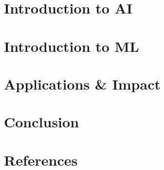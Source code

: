 \section[IntroAI]{Introduction to AI}


\section[IntroML]{Introduction to ML}


\section[Impact]{Applications \& Impact}


\section[Concl]{Conclusion}


\section[Refs]{References}


